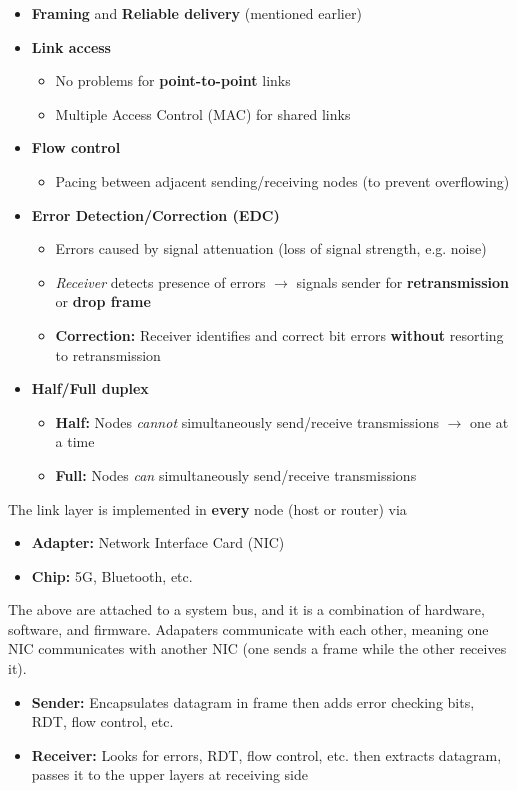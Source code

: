 \documentclass{article}
\begin{document}
\begin{itemize}
    \item \textbf{Framing} and \textbf{Reliable delivery} (mentioned earlier)
    \item \textbf{Link access}
    \begin{itemize}
        \item No problems for \textbf{point-to-point} links
        \item Multiple Access Control (MAC) for shared links
    \end{itemize}

    \item \textbf{Flow control}
    \begin{itemize}
        \item Pacing between adjacent sending/receiving nodes (to prevent overflowing)
    \end{itemize}

    \item \textbf{Error Detection/Correction (EDC)}
    \begin{itemize}
        \item Errors caused by signal attenuation (loss of signal strength, e.g. noise)
        \item \textit{Receiver} detects presence of errors $\rightarrow$ signals sender for \textbf{retransmission}
        or \textbf{drop frame}
        \item \textbf{Correction:} Receiver identifies and correct bit errors \textbf{without} resorting
        to retransmission 
    \end{itemize}

    \item \textbf{Half/Full duplex}
    \begin{itemize}
        \item \textbf{Half:} Nodes \textit{cannot} simultaneously send/receive transmissions $\rightarrow$ one at a time
        \item \textbf{Full:} Nodes \textit{can} simultaneously send/receive transmissions
    \end{itemize}
\end{itemize}
The link layer is implemented in \textbf{every} node (host or router) via
\begin{itemize}
    \item \textbf{Adapter:} Network Interface Card (NIC)
    \item \textbf{Chip:} 5G, Bluetooth, etc.
\end{itemize}
The above are attached to a system bus, and it is a combination of hardware, software, and firmware. 
Adapaters communicate with each other, meaning one NIC communicates with another NIC (one sends
a frame while the other receives it).
\begin{itemize}
    \item \textbf{Sender:} Encapsulates datagram in frame then adds error checking bits, RDT,
    flow control, etc.
    \item \textbf{Receiver:} Looks for errors, RDT, flow control, etc. then extracts datagram, 
    passes it to the upper layers at receiving side
\end{itemize}
\newpage
\end{document}
